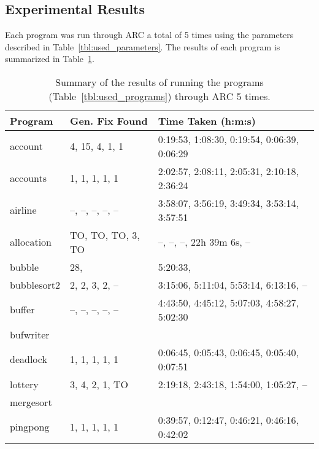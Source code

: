 \subsection{Experimental Results}
\label{sec:experimental_results}

Each program was run through ARC a total of 5 times using the parameters
described in Table~\ref{tbl:used_parameters}. The results of each program is
summarized in Table~\ref{tbl:summary_results}.

\begin{table}%
\caption{Summary of the results of running the programs
(Table~\ref{tbl:used_programs}) through ARC 5 times.}
\begin{center}
\lstset{basicstyle=\scriptsize}
\begin{tabular}{|l|l|l|}
\hline
\textbf{Program} & \textbf{Gen. Fix Found} & \textbf{Time Taken (h:m:s)}\\
\hline
account & 4, 15, 4, 1, 1 & 0:19:53, 1:08:30, 0:19:54, 0:06:39, 0:06:29\\
\hline
accounts & 1, 1, 1, 1, 1 & 2:02:57, 2:08:11, 2:05:31, 2:10:18, 2:36:24\\
\hline
airline & --, --, --, --, -- & 3:58:07, 3:56:19, 3:49:34, 3:53:14, 3:57:51\\
\hline
allocation & TO, TO, TO, 3, TO & --, --, --, 22h 39m 6s, --  \\
\hline
bubble & 28, & 5:20:33, \\
\hline
bubblesort2 & 2, 2, 3, 2, -- & 3:15:06, 5:11:04, 5:53:14, 6:13:16, -- \\
\hline
buffer & --, --, --, --, -- & 4:43:50, 4:45:12, 5:07:03, 4:58:27, 5:02:30\\
\hline
bufwriter &  & \\
\hline
deadlock & 1, 1, 1, 1, 1 & 0:06:45, 0:05:43, 0:06:45, 0:05:40, 0:07:51\\
\hline
lottery & 3, 4, 2, 1, TO & 2:19:18, 2:43:18, 1:54:00, 1:05:27, --\\
\hline
mergesort & & \\
\hline
pingpong & 1, 1, 1, 1, 1 & 0:39:57, 0:12:47, 0:46:21, 0:46:16, 0:42:02\\
\hline
\end{tabular}
\label{tbl:summary_results}
\end{center}
\end{table}
